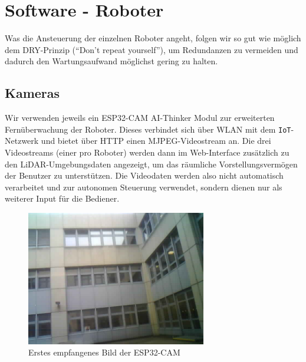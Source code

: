 
\chapter{Software - Roboter}
\label{sec:software_robots}
Was die Ansteuerung der einzelnen Roboter angeht, folgen wir so gut wie möglich dem DRY-Prinzip (``Don't repeat yourself''),
um Redundanzen zu vermeiden und dadurch den Wartungsaufwand möglichst gering zu halten.

\section{Kameras}
\label{subsec:robots_cams}
Wir verwenden jeweils ein ESP32-CAM AI-Thinker Modul zur erweiterten
Fernüberwachung der Roboter.
%
Dieses verbindet sich über WLAN mit dem \texttt{IoT}-Netzwerk und bietet über HTTP einen MJPEG-Videostream an.
%
Die drei Videostreams (einer pro Roboter) werden dann im Web-Interface
zusätzlich zu den LiDAR-Umgebungsdaten angezeigt,
um das räumliche Vorstellungsvermögen der Benutzer zu unterstützen.
%
Die Videodaten werden also nicht automatisch verarbeitet und zur autonomen Steuerung verwendet,
sondern dienen nur als weiterer Input für die Bediener.
\begin{figure}[H]
    \includegraphics[width=0.7\textwidth, center]{img/cam_erstes_bild.png}
    \caption{Erstes empfangenes Bild der ESP32-CAM}
    \label{fig:cam_erstes_bild}
\end{figure}

